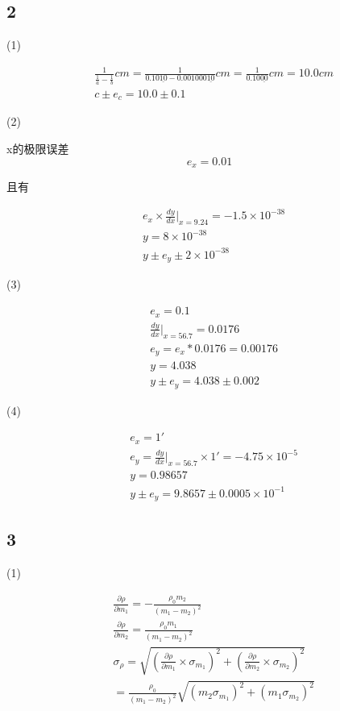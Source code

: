 \documentclass[a4paper,10pt,notitlepage]{report}
\begin{document}
\subsection*{2}

	(1)

\begin{align}
	&\frac{1}{\frac{1}{a} - \frac{1}{b}} cm = \frac{1}{0.10 \underline{10} - 0.001000 \underline{10}} cm = \frac{1}{0.10\underline{00}} cm = 10.0 cm  \\
	&c \pm e_c = 10.0 \pm 0.1
\end{align}

	(2)

	x的极限误差 \\
	
\begin{equation}
	e_x = 0.01
\end{equation}

	且有

\begin{align}
	&e_x \times \frac{dy}{dx} | _{x = 9.24} = -1.5 \times 10^{-38} \\
	&y = 8 \times 10^{-38} \\
	&y \pm e_y \pm 2 \times 10^{-38}
\end{align}
	
	(3)

\begin{align}
	&e_x = 0.1 \\
	&\frac{dy}{dx} | _{x = 56.7} = 0.0176 \\
	&e_y = e_x * 0.0176 = 0.00176 \\
	&y = 4.038 \\
	&y \pm e_y = 4.038 \pm 0.002
\end{align}

	(4)
	
\begin{align}
	&e_x = 1' \\
	&e_y = \frac{dy}{dx} | _{x = 56.7} \times 1' = -4.75 \times 10^{-5} \\
	&y = 0.98657 \\
	&y \pm e_y = 9.8657 \pm 0.0005 \times 10^{-1}
\end{align}

\subsection*{3}

	(1)

\begin{align}
	&\frac{\partial \rho}{\partial m_1} = - \frac{\rho_0 m_2}{(m_1 - m_2)^2} \\
	&\frac{\partial \rho}{\partial m_2} = \frac{\rho_0 m_1}{(m_1 - m_2)^2} \\
	&\sigma_\rho = \sqrt{(\frac{\partial \rho}{\partial m_1} \times \sigma_{m_1})^2 + (\frac{\partial \rho}{\partial m_2} \times \sigma_{m_2})^2} \\
	&= \frac{\rho_0}{(m_1 - m_2)^2}\sqrt{(m_2 \sigma_{m_1})^2 + (m_1 \sigma_{m_2})^2}
\end{align}
\end{document}
